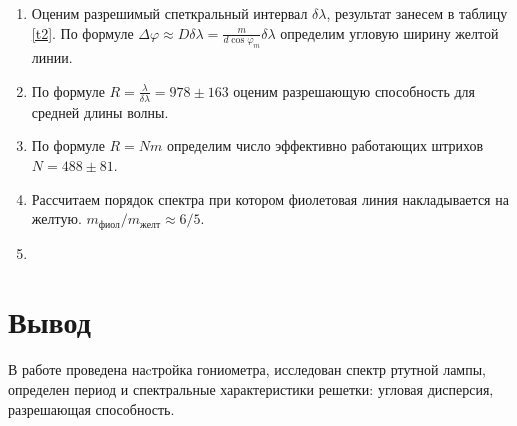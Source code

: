 \documentclass[a4paper,12pt]{article}
\theoremstyle{plain} %
\theoremstyle{definition} %
\theoremstyle{remark} %
\begin{document}
\begin{enumerate}
	\item Оценим разрешимый спеткральный интервал $\delta \lambda$, результат занесем в таблицу \ref{t2}. По формуле $\Delta \varphi \approx D \delta \lambda = \frac{m}{d \cos{\varphi_m}} \delta \lambda$ определим угловую ширину желтой линии. 
	\item По формуле $R = \frac{ \lambda}{\delta \lambda} = 978 \pm 163$ оценим разрешающую способность для средней длины волны.
	\item По формуле $R = Nm$ определим число эффективно работающих штрихов $N=488 \pm 81$.
	\item Рассчитаем порядок спектра при котором фиолетовая линия накладывается на желтую. $m_{\text{фиол}}/m_{\text{желт}} \approx 6/5$.
	\item 
	
	
\end{enumerate}

\section{Вывод}

В работе проведена наcтройка гониометра, исследован спектр ртутной лампы, определен период и спектральные характеристики решетки: угловая дисперсия, разрешающая способность.
		
		
		
	
	
\end{document}
